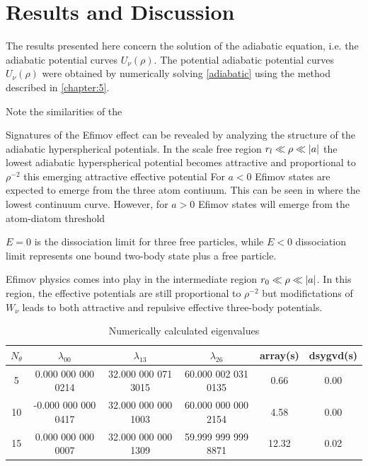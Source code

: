 \chapter{Results and Discussion}
The results presented here concern the solution of the adiabatic equation, i.e. the adiabatic potential curves $U_{\nu}(\rho)$. The potential adiabatic potential curves $U_{\nu}(\rho)$ were obtained by numerically solving  \eqref{adiabatic} using the method described in \cref{chapter:5}. 

Note the similarities of the 

Signatures of the Efimov effect can be revealed by analyzing the structure of the adiabatic hyperspherical potentials. In the scale free region $r_l \ll \rho \ll
\lvert a\rvert$ the lowest adiabatic hyperspherical potential becomes attractive and proportional to $\rho^{-2}$ this emerging attractive effective potential   For $a<0$ Efimov states are expected to emerge from the three atom contiuum. This can be seen in  where the lowest continuum curve. However, for $a>0$ Efimov states will emerge from the atom-diatom threshold      
 
$ E = 0$ is the dissociation limit
for three free particles, while $E < 0$ dissociation limit represents one bound two-body state plus a free particle.
 
 Efimov physics comes into play in the intermediate region $r_0 \ll \rho \ll \lvert a\rvert$. In this region, the effective potentials are still proportional to $\rho^{-2}$ but modifictations of $W_{\nu}$ leads to both attractive and repulsive effective three-body potentials.   

\begin{table}[h!]
	\centering
	\begin{tabular}{||c c c c c c||} 
		\hline
		$N_{\theta}$ & $\lambda_{0 0}$ & $\lambda_{1 3}$ & $\lambda_{2 6}$ & array(s) & dsygvd(s)
		\\ [0.5ex] 
		\hline\hline
		5	   & 0.000 000 000 0214   & 32.000 000 071 3015 & 60.000 002 031 0135 & 0.66 & 0.00  \\
		10     & -0.000 000 000 0417  & 32.000 000 000 1003 & 60.000 000 000 2154  & 4.58 & 0.00 \\
		15 & 0.000 000 000 0007 & 32.000 000 000 1309 & 59.999 999 999 8871& 12.32& 0.02 \\  [1ex] 
		\hline
	\end{tabular}
	\caption{Numerically calculated eigenvalues}
	\label{table:2}
\end{table}


